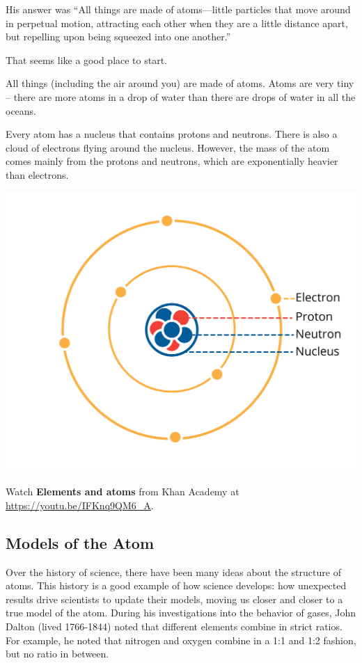 His answer was ``All things are made of atoms—little particles that move around in
perpetual motion, attracting each other when they are a little
distance apart, but repelling upon being squeezed into one another.''

That seems like a good place to start.

All things (including the air around you) are made of atoms. Atoms are
very tiny -- there are more atoms in a drop of water than there are
drops of water in all the oceans.

Every atom has a nucleus that contains protons and neutrons. There is also
a cloud of electrons flying around the nucleus. However, the mass of the atom
comes mainly from the protons and neutrons, which are exponentially heavier
than electrons.  

\includegraphics[width=1\textwidth]{atom1.png}

Watch \textbf{Elements and atoms} from Khan Academy at \url{https://youtu.be/IFKnq9QM6_A}.

\subsection{Models of the Atom} 
Over the history of science, there have been many ideas about the structure of 
atoms. This history is a good example of how science develops: how unexpected 
results drive scientists to update their models, moving us closer and closer to 
a true model of the atom. During his investigations into the behavior of gases, 
John Dalton (lived 1766-1844) noted that different elements combine in strict 
ratios. For example, he noted that nitrogen and oxygen combine in a 1:1 and 1:2 
fashion, but no ratio in between.

